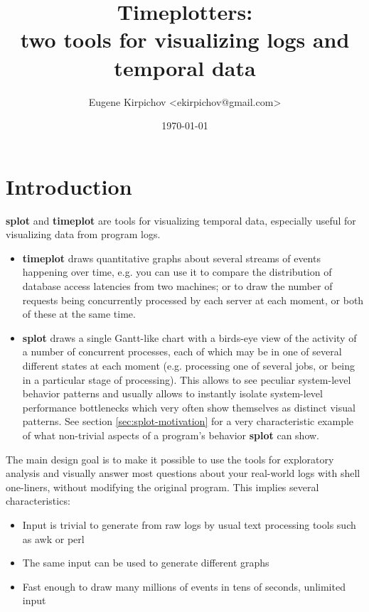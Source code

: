 \documentclass{article}
\begin{document}
\title{Timeplotters:\\
two tools for visualizing logs and temporal data}
\author{Eugene Kirpichov <ekirpichov@gmail.com>}
\date{\today}
\maketitle

\tableofcontents

\def\splot{\textbf{splot}}
\def\timeplot{\textbf{timeplot}}
\def\awk{\textbf{awk}}


\setlength{\parskip}{2mm plus1mm minus1mm}

\section{Introduction}

\splot{} and \timeplot{} are tools for visualizing temporal data, especially useful for visualizing data from program logs.

\begin{itemize}
\item \timeplot{} draws quantitative graphs about several streams of events happening over time, e.g. you can use it to compare the distribution of database access latencies from two machines; or to draw the number of requests being concurrently processed by each server at each moment, or both of these at the same time.
\item \splot{} draws a single Gantt-like chart with a birds-eye view of the activity of a number of concurrent processes, each of which may be in one of several different states at each moment (e.g. processing one of several jobs, or being in a particular stage of processing). This allows to see peculiar system-level behavior patterns and usually allows to instantly isolate system-level performance bottlenecks which very often show themselves as distinct visual patterns. See section \ref{sec:splot-motivation} for a very characteristic example of what non-trivial aspects of a program's behavior \splot{} can show.
\end{itemize}

The main design goal is to make it possible to use the tools for exploratory analysis and visually answer most questions about your real-world logs with shell one-liners, without modifying the original program. This implies several characteristics:

\begin{itemize}
\item Input is trivial to generate from raw logs by usual text processing tools such as awk or perl
\item The same input can be used to generate different graphs
\item Fast enough to draw many millions of events in tens of seconds, unlimited input
\end{itemize} 
\end{document}
